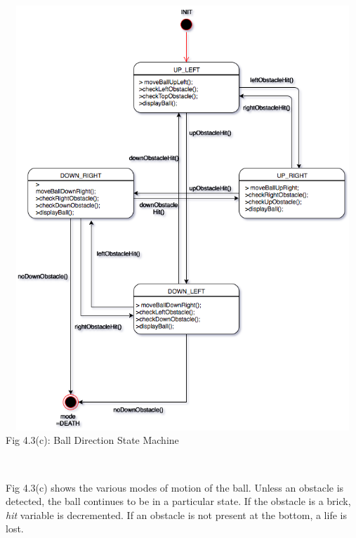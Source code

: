 \documentclass[a4paper,12pt,oneside]{book}
\begin{document}
\begin{center}
\includegraphics[width=14cm, height=16cm]{BreakoutImages/ballDirectionStatemachine} \\
\caption{Fig 4.3(c): Ball Direction State Machine} \\
\end{center}
\qquad Fig 4.3(c) shows the various modes of motion of the ball. Unless an obstacle is detected, the ball continues to be in a particular state. If the obstacle is a brick, \textit{hit} variable is decremented. If an obstacle is not present at the bottom, a life is lost.
\end{document}
